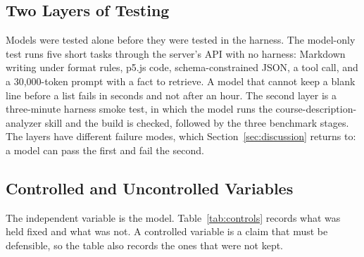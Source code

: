 \documentclass[11pt]{article}
\begin{document}
\subsection{Two Layers of Testing}

Models were tested alone before they were tested in the harness. The model-only test runs five short tasks through the server's API with no harness: Markdown writing under format rules, p5.js code, schema-constrained JSON, a tool call, and a 30,000-token prompt with a fact to retrieve. A model that cannot keep a blank line before a list fails in seconds and not after an hour. The second layer is a three-minute harness smoke test, in which the model runs the course-description-analyzer skill and the build is checked, followed by the three benchmark stages. The layers have different failure modes, which Section~\ref{sec:discussion} returns to: a model can pass the first and fail the second.

\subsection{Controlled and Uncontrolled Variables}

The independent variable is the model. Table~\ref{tab:controls} records what was held fixed and what was not. A controlled variable is a claim that must be defensible, so the table also records the ones that were not kept.
\end{document}
